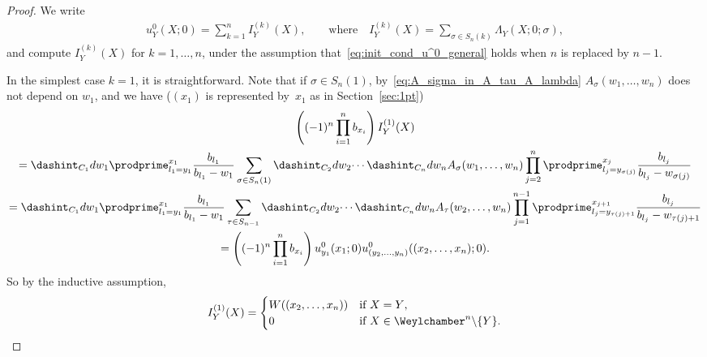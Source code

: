 \begin{proof}
 We write
 \begin{gather*}
 u^0_Y(X; 0) = \sum^n_{k = 1} I^{(k)}_Y(X), \qquad \text{where} \quad I^{(k)}_Y(X) = \sum_{\sigma \in S_n(k)} \Lambda_Y(X; 0; \sigma),
 \end{gather*}
 and compute $I^{(k)}_Y(X)$ for $k = 1, \dotsc, n$, under the assumption that~\eqref{eq:init_cond_u^0_general} holds when $n$ is replaced by $n - 1$.

 In the simplest case $k = 1$, it is straightforward. Note that if $\sigma \in S_n(1)$, by~\eqref{eq:A_sigma_in_A_tau_A_lambda} $A_{\sigma}(w_1, \dotsc, w_n)$ does not depend on $w_1$, and we have ($(x_1)$ is represented by~$x_1$ as in Section~\ref{sec:1pt})
 \begin{gather*}
  \left( (-1)^n \prod^n_{i = 1} b_{x_i} \right) I^{(1)}_Y(X) \\
 =   \dashint_{C_1} dw_1 \prodprime^{x_1}_{l_1 = y_1} \frac{b_{l_1}}{b_{l_1} - w_1} \sum_{\sigma \in S_n(1)} \dashint_{C_2} dw_2 \dotsi \dashint_{C_n} dw_n A_{\sigma}(w_1, \dotsc, w_n) \prod^n_{j = 2} \prodprime^{x_j}_{l_j = y_{\sigma(j)}} \frac{b_{l_j}}{b_{l_j} - w_{\sigma(j)}} \\
 =   \dashint_{C_1} dw_1 \prodprime^{x_1}_{l_1 = y_1} \frac{b_{l_1}}{b_{l_1} - w_1} \sum_{\tau \in S_{n - 1}} \dashint_{C_2} dw_2 \dotsi \dashint_{C_n} dw_n A_{\tau}(w_2, \dotsc, w_n) \prod^{n - 1}_{j = 1} \prodprime^{x_{j + 1}}_{l_j = y_{\tau(j) + 1}} \frac{b_{l_j}}{b_{l_j} - w_{\tau(j) + 1}} \\
 =  \left( (-1)^n \prod^n_{i = 1} b_{x_i} \right) u^0_{y_1}(x_1; 0) u^0_{(y_2, \dotsc, y_n)}((x_2, \dotsc, x_n); 0).
 \end{gather*}
 So by the inductive assumption,
 \begin{gather*}
 I^{(1)}_Y(X) =
 \begin{cases}
 W((x_2, \dotsc, x_n)) & \text{if $X = Y$}, \\
 0 & \text{if $X \in \Weylchamber^n {\setminus} \{ Y \}$}.
 \end{cases}
 \end{gather*}


\end{proof}
